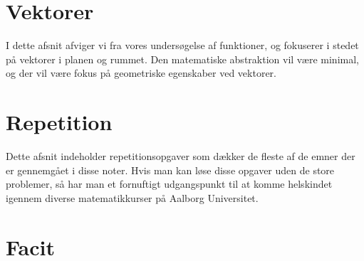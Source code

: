








\chapter{Vektorer}
I dette afsnit afviger vi fra vores undersøgelse af funktioner, og fokuserer i stedet på vektorer i planen og rummet. Den matematiske abstraktion vil være minimal, og der vil være fokus på geometriske egenskaber ved vektorer. 











\chapter{Repetition}\label{ch:rep}
Dette afsnit indeholder repetitionsopgaver som dækker de fleste af de emner der er gennemgået i disse noter. Hvis man kan løse disse opgaver uden de store problemer, så har man et fornuftigt udgangspunkt til at komme helskindet igennem diverse matematikkurser på Aalborg Universitet. 


\chapter{Facit}
































